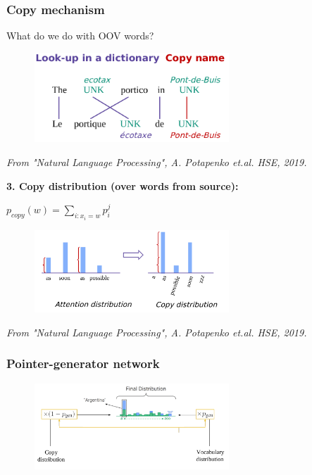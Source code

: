 \documentclass{tum-presentation}
\begin{document}
\begin{frame}
	\frametitle{Copy mechanism}
	\huge What do we do with OOV words?
	\begin{figure}
		\centering
		\includegraphics[width=0.65\textwidth,keepaspectratio=true]{tum-resources/images/copy_mech_3.png}
		\label{fig:copy_mech_3}
	\end{figure}
	\begin{flushright}
	\small \textit{	From "Natural Language Processing", A. Potapenko et.al. HSE, 2019. }
	\end{flushright}
\end{frame}

\begin{frame}
	\huge \textbf{\textcolor{TUMBlau}{3. Copy distribution (over words from source):}}
	\begin{center}
		$p_{copy}(w) = \sum_{i: x_i=w} p_i^{j}$
	\end{center}
	\begin{figure}
		\centering
		\includegraphics[width=0.65\textwidth,keepaspectratio=true]{tum-resources/images/p_summ_5.png}
		\label{fig:p_summ_5}
	\end{figure}
	\begin{flushright}
	\small \textit{	From "Natural Language Processing", A. Potapenko et.al. HSE, 2019. }
	\end{flushright}
\end{frame}

\begin{frame}
	\frametitle{Pointer-generator network}
	\begin{figure}
		\centering
		\includegraphics[width=0.65\textwidth,keepaspectratio=true]{tum-resources/images/p_summ_6.png}
		\label{fig:p_summ_6}
	\end{figure}
\end{frame}
\end{document}

